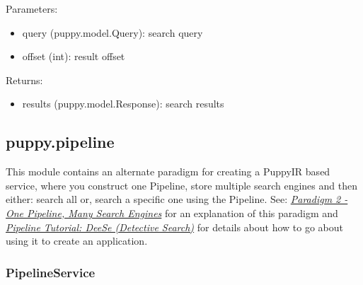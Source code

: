 \documentclass[letterpaper,10pt,english]{sphinxmanual}
\begin{document}
\begin{fulllineitems}
\begin{fulllineitems}
Parameters:
\begin{itemize}
\item {} 
query (puppy.model.Query): search query

\item {} 
offset (int): result offset

\end{itemize}

Returns:
\begin{itemize}
\item {} 
results (puppy.model.Response): search results

\end{itemize}

\end{fulllineitems}


\end{fulllineitems}



\subsection{puppy.pipeline}
\label{api3.0:module-puppy.pipeline}\label{api3.0:puppy-pipeline}
This module contains an alternate paradigm for creating a PuppyIR based service, where you construct one Pipeline, store multiple search engines and then either: search all or, search a specific one using the Pipeline. See: {\hyperref[pipeline:pipeline-architecture]{\emph{Paradigm 2 - One Pipeline, Many Search Engines}}} for an explanation of this paradigm and {\hyperref[pipeline-tutorial:pipeline-puppyir-tutorial]{\emph{Pipeline Tutorial: DeeSe (Detective Search)}}} for details about how to go about using it to create an application.


\subsubsection{PipelineService}
\label{api3.0:pipelineservice}
\end{document}
